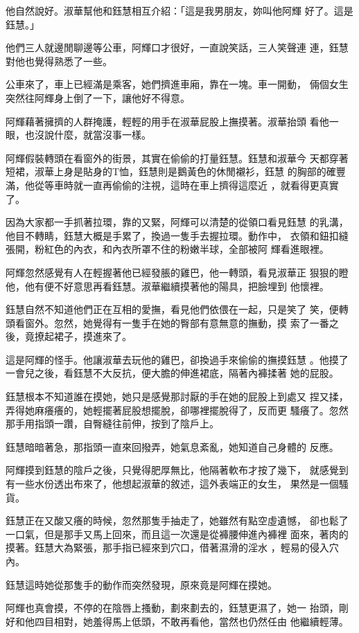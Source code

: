 他自然說好。淑華幫他和鈺慧相互介紹：「這是我男朋友，妳叫他阿輝
好了。這是鈺慧。」

他們三人就邊閒聊邊等公車，阿輝口才很好，一直說笑話，三人笑聲連
連，鈺慧對他也覺得熟悉了一些。

公車來了，車上已經滿是乘客，她們擠進車廂，靠在一塊。車一開動，
倆個女生突然往阿輝身上倒了一下，讓他好不得意。

阿輝藉著擁擠的人群掩護，輕輕的用手在淑華屁股上撫摸著。淑華抬頭
看他一眼，也沒說什麼，就當沒事一樣。

阿輝假裝轉頭在看窗外的街景，其實在偷偷的打量鈺慧。鈺慧和淑華今
天都穿著短裙，淑華上身是貼身的T恤，鈺慧則是鵝黃色的休閒襯衫，鈺慧
的胸部的確豐滿，他從等車時就一直再偷偷的注視，這時在車上擠得這麼近
，就看得更真實了。

因為大家都一手抓著拉環，靠的又緊，阿輝可以清楚的從領口看見鈺慧
的乳溝，他目不轉睛，鈺慧大概是手累了，換過一隻手去握拉環。動作中，
衣領和鈕扣縫張開，粉紅色的內衣，和內衣所罩不住的粉嫩半球，全部被阿
輝看進眼裡。

阿輝忽然感覺有人在輕握著他已經發脹的雞巴，他一轉頭，看見淑華正
狠狠的瞪他，他有便不好意思再看鈺慧。淑華繼續摸著他的陽具，把臉埋到
他懷裡。

鈺慧自然不知道他們正在互相的愛撫，看見他們依偎在一起，只是笑了
笑，便轉頭看窗外。忽然，她覺得有一隻手在她的臀部有意無意的撫動，摸
索了一番之後，竟撩起裙子，摸進來了。

這是阿輝的怪手。他讓淑華去玩他的雞巴，卻換過手來偷偷的撫摸鈺慧
。他摸了一會兒之後，看鈺慧不大反抗，便大膽的伸進裙底，隔著內褲揉著
她的屁股。

鈺慧根本不知道誰在摸她，她只是感覺那討厭的手在她的屁股上到處又
捏又揉，弄得她麻癢癢的，她輕擺著屁股想擺脫，卻哪裡擺脫得了，反而更
騷癢了。忽然那手用指頭一躦，自臀縫往前伸，按到了陰戶上。

鈺慧暗暗著急，那指頭一直來回撥弄，她氣息紊亂，她知道自己身體的
反應。

阿輝摸到鈺慧的陰戶之後，只覺得肥厚無比，他隔著軟布才按了幾下，
就感覺到有一些水份透出布來了，他想起淑華的敘述，這外表端正的女生，
果然是一個騷貨。

鈺慧正在又酸又癢的時候，忽然那隻手抽走了，她雖然有點空虛遺憾，
卻也鬆了一口氣，但是那手又馬上回來，而且這一次還是從褲腰伸進內褲裡
面來，著肉的摸著。鈺慧大為緊張，那手指已經來到穴口，借著濕滑的淫水
，輕易的侵入穴內。

鈺慧這時她從那隻手的動作而突然發現，原來竟是阿輝在摸她。

阿輝也真會摸，不停的在陰唇上搔動，劃來劃去的，鈺慧更濕了，她一
抬頭，剛好和他四目相對，她羞得馬上低頭，不敢再看他，當然也仍然任由
他繼續輕薄。

